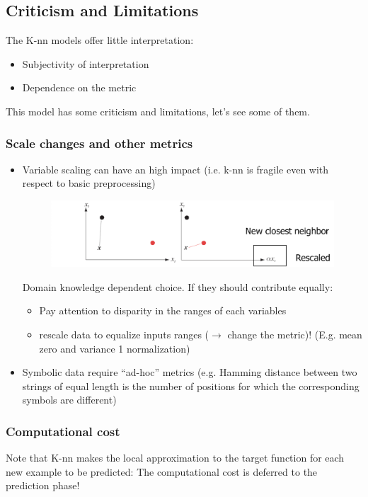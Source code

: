 \documentclass[../main.tex]{subfiles}
\begin{document}
\subsection{Criticism and Limitations}
The K-nn models offer little interpretation:
\begin{itemize}
    \item Subjectivity of interpretation
    \item Dependence on the metric
\end{itemize}
This model has some criticism and limitations, let's see some of them.
\subsubsection{Scale changes and other metrics}
\begin{itemize}
    \item Variable scaling can have an high impact (i.e. k-nn is fragile even with respect to basic preprocessing)
    \begin{figure}[H]
        \centering
        \includegraphics[scale = 0.2]{lectures/3_K_nn/3_scale_and_metrics.png}
    \end{figure}
    Domain knowledge dependent choice. If they should contribute equally: 
    \begin{itemize}
        \item Pay attention to disparity in the ranges of each variables
        \item rescale data to equalize inputs ranges ($\rightarrow$ change the metric)! (E.g. mean zero and variance 1 normalization)
    \end{itemize}
    
    \item Symbolic data require “ad-hoc” metrics (e.g. Hamming distance between two strings of equal length is the number of positions for which the corresponding symbols are different)
\end{itemize}

\subsubsection{Computational cost}
Note that K-nn makes the local approximation to the target function for each new example to be predicted: The computational cost is deferred to the prediction phase!\\
\end{document}
